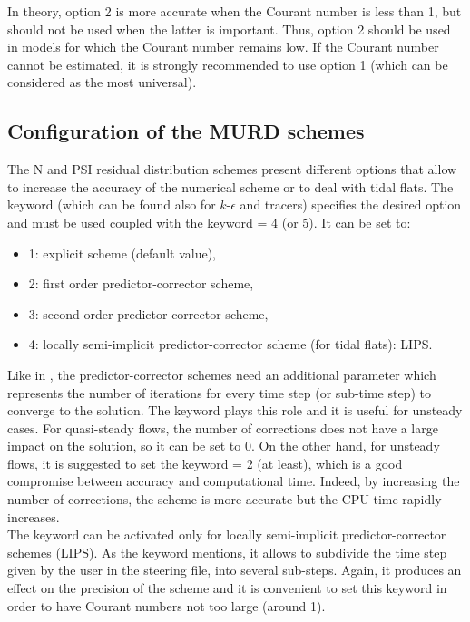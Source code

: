 In theory, option 2 is more accurate when the Courant number is less than 1,
but should not be used when the latter is important. Thus, option 2 should be
used in models for which the Courant number remains low. If the Courant number
cannot be estimated, it is strongly recommended to use option 1 (which can be
considered as the most universal).

\subsection{Configuration of the MURD schemes}
\label{sec:MURD}
The N and PSI residual distribution schemes present different options that allow
to increase the accuracy of the numerical scheme or to deal with tidal flats.
The keyword  (which can be
found also for $k$-$\epsilon$ and tracers) specifies the desired option and must
be used coupled with the keyword
= 4 (or 5).
It can be set to:
\begin{itemize}
 \item 1: explicit scheme (default value),
 \item 2: first order predictor-corrector scheme,
 \item 3: second order predictor-corrector scheme,
 \item 4: locally semi-implicit predictor-corrector scheme
(for tidal flats): LIPS.
\end{itemize}
Like in , the predictor-corrector schemes need an additional
parameter which represents the number of iterations for every time step
(or sub-time step) to converge to the solution.
The keyword  plays this
role and it is useful for unsteady cases.
For quasi-steady flows, the number of corrections does not have a large impact
on the solution, so it can be set to 0.
On the other hand, for unsteady flows, it is suggested to set the keyword
= 2 (at least),
which is a good compromise between accuracy and computational time.
Indeed, by increasing the number of corrections, the scheme is more accurate but
the CPU time rapidly increases.\\
The keyword  can be
activated only for locally semi-implicit predictor-corrector schemes (LIPS).
As the keyword mentions, it allows to subdivide the time step given by the user
in the steering file, into several sub-steps.
Again, it produces an effect on the precision of the scheme and it is convenient
to set this keyword in order to have Courant numbers not too large (around 1).

